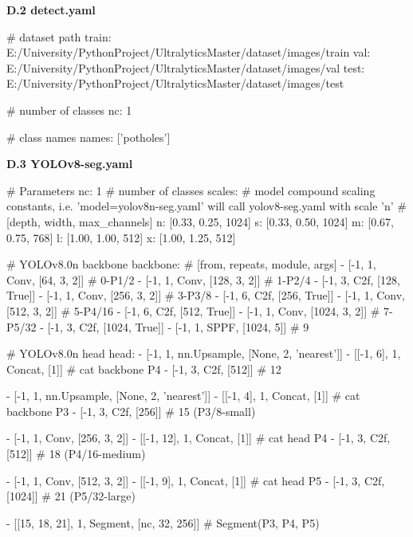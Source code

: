 \documentclass{MathorCupmodeling}
\begin{document}
\textbf{D.2 detect.yaml}
\begin{python}
# dataset path
train: E:/University/PythonProject/UltralyticsMaster/dataset/images/train
val: E:/University/PythonProject/UltralyticsMaster/dataset/images/val
test: E:/University/PythonProject/UltralyticsMaster/dataset/images/test

# number of classes
nc: 1

# class names
names: ['potholes']
\end{python}

\textbf{D.3 YOLOv8-seg.yaml}
\begin{python}
# Parameters
nc: 1  # number of classes
scales: # model compound scaling constants, i.e. 'model=yolov8n-seg.yaml' will call yolov8-seg.yaml with scale 'n'
  # [depth, width, max_channels]
  n: [0.33, 0.25, 1024]
  s: [0.33, 0.50, 1024]
  m: [0.67, 0.75, 768]
  l: [1.00, 1.00, 512]
  x: [1.00, 1.25, 512]

# YOLOv8.0n backbone
backbone:
  # [from, repeats, module, args]
  - [-1, 1, Conv, [64, 3, 2]]  # 0-P1/2
  - [-1, 1, Conv, [128, 3, 2]]  # 1-P2/4
  - [-1, 3, C2f, [128, True]]
  - [-1, 1, Conv, [256, 3, 2]]  # 3-P3/8
  - [-1, 6, C2f, [256, True]]
  - [-1, 1, Conv, [512, 3, 2]]  # 5-P4/16
  - [-1, 6, C2f, [512, True]]
  - [-1, 1, Conv, [1024, 3, 2]]  # 7-P5/32
  - [-1, 3, C2f, [1024, True]]
  - [-1, 1, SPPF, [1024, 5]]  # 9

# YOLOv8.0n head
head:
  - [-1, 1, nn.Upsample, [None, 2, 'nearest']]
  - [[-1, 6], 1, Concat, [1]]  # cat backbone P4
  - [-1, 3, C2f, [512]]  # 12

  - [-1, 1, nn.Upsample, [None, 2, 'nearest']]
  - [[-1, 4], 1, Concat, [1]]  # cat backbone P3
  - [-1, 3, C2f, [256]]  # 15 (P3/8-small)

  - [-1, 1, Conv, [256, 3, 2]]
  - [[-1, 12], 1, Concat, [1]]  # cat head P4
  - [-1, 3, C2f, [512]]  # 18 (P4/16-medium)

  - [-1, 1, Conv, [512, 3, 2]]
  - [[-1, 9], 1, Concat, [1]]  # cat head P5
  - [-1, 3, C2f, [1024]]  # 21 (P5/32-large)

  - [[15, 18, 21], 1, Segment, [nc, 32, 256]]  # Segment(P3, P4, P5)
\end{python}
\end{document}
